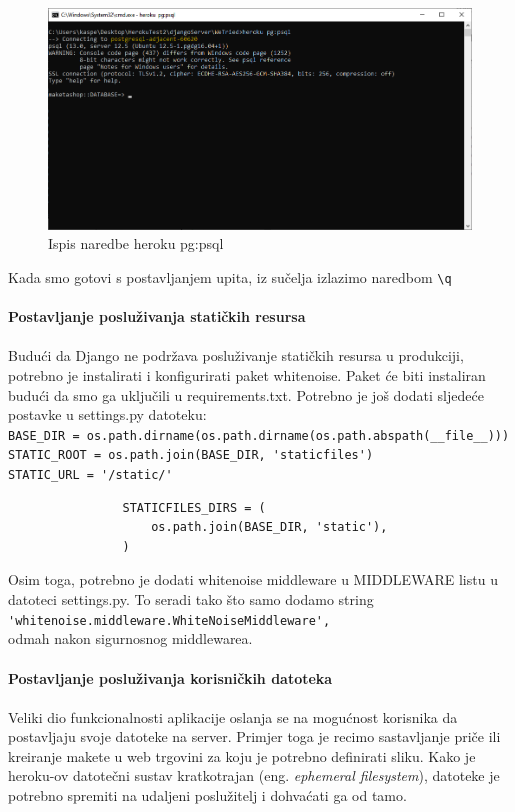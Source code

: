 {			\begin{figure}[H]
				\centering
				\includegraphics[width=1\linewidth]{slike/herokuPostgresql2}
				\caption{Ispis naredbe heroku pg:psql}
				\label{fig:pgpsql}
			\end{figure}
			Kada smo gotovi s postavljanjem upita, iz sučelja izlazimo naredbom \verb|\q|\\
			\\
			\textbf{Postavljanje posluživanja statičkih resursa}
			\\
			\\
			Budući da Django ne podržava posluživanje statičkih resursa u produkciji, potrebno je instalirati i konfigurirati paket whitenoise. Paket će biti instaliran budući da smo ga uključili u requirements.txt. Potrebno je još dodati sljedeće postavke u settings.py datoteku:\\
			\verb|BASE_DIR = os.path.dirname(os.path.dirname(os.path.abspath(__file__)))|\\
			\verb|STATIC_ROOT = os.path.join(BASE_DIR, 'staticfiles')|\\
			\verb|STATIC_URL = '/static/'|
			\begin{verbatim}
				STATICFILES_DIRS = (
					os.path.join(BASE_DIR, 'static'),
				)
			\end{verbatim}
			Osim toga, potrebno je dodati whitenoise middleware u MIDDLEWARE listu u datoteci settings.py. To seradi tako što samo dodamo string\\ \verb|'whitenoise.middleware.WhiteNoiseMiddleware',|\\ odmah nakon sigurnosnog middlewarea.
			\\
			\\
			\textbf{Postavljanje posluživanja korisničkih datoteka}
			\\
			\\
			Veliki dio funkcionalnosti aplikacije oslanja se na mogućnost korisnika da postavljaju svoje datoteke na server. Primjer toga je recimo sastavljanje priče ili kreiranje makete u web trgovini za koju je potrebno definirati sliku. Kako je heroku-ov datotečni sustav kratkotrajan (eng. \textit{ephemeral filesystem}), datoteke je potrebno spremiti na udaljeni poslužitelj i dohvaćati ga od tamo.\\
}
